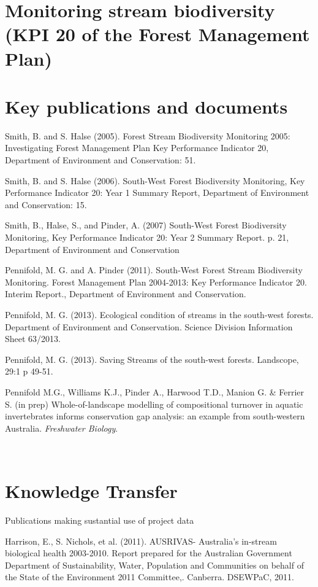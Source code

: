 \documentclass[version=last, 
    paper=a4, %
    10pt, %
    usenames,
    dvipsnames, 
    oneside, %
    headings=openany, %
    DIV=15 %
]{scrbook}
\begin{document}
\section*{Monitoring stream biodiversity (KPI 20 of the Forest Management Plan)
}


\section*{Key publications and documents}
Smith, B. and S. Halse (2005). Forest Stream Biodiversity Monitoring
2005: Investigating Forest Management Plan Key Performance Indicator 20,
Department of Environment and Conservation: 51.

Smith, B. and S. Halse (2006). South-West Forest Biodiversity
Monitoring, Key Performance Indicator 20: Year 1 Summary Report,
Department of Environment and Conservation: 15.

Smith, B., Halse, S., and Pinder, A. (2007) South-West Forest
Biodiversity Monitoring, Key Performance Indicator 20: Year 2 Summary
Report. p. 21, Department of Environment and Conservation

Pennifold, M. G. and A. Pinder (2011). South-West Forest Stream
Biodiversity Monitoring. Forest Management Plan 2004-2013: Key
Performance Indicator 20.~ Interim Report., Department of Environment
and Conservation.

Pennifold, M. G. (2013). Ecological condition of streams in the
south-west forests. Department of Environment and Conservation. Science
Division Information Sheet 63/2013.

Pennifold, M. G. (2013). Saving Streams of the south-west forests.
Landscope, 29:1 p 49-51.

Pennifold M.G., Williams K.J., Pinder A., Harwood T.D., Manion G. \&
Ferrier S. (in prep) Whole-of-landscape modelling of compositional
turnover in aquatic invertebrates informs conservation gap analysis: an
example from south-western Australia. \emph{Freshwater Biology}.

~



\section*{Knowledge Transfer}
Publications making sustantial use of project data

Harrison, E., S. Nichols, et al. (2011). AUSRIVAS- Australia's in-stream
biological health 2003-2010. Report prepared for the Australian
Government Department of Sustainability, Water, Population and
Communities on behalf of the State of the Environment 2011 Committee,.
Canberra. DSEWPaC, 2011.
\end{document}
